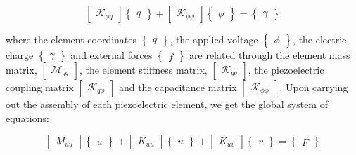 \documentclass{ifacconf}
\begin{document}
\begin{equation}
\begin{bmatrix} \mathcal{K}_{\phi q} \end{bmatrix} \begin{Bmatrix} q \end{Bmatrix} + \begin{bmatrix} \mathcal{K}_{\phi \phi} \end{bmatrix} \begin{Bmatrix} \phi \end{Bmatrix} = \begin{Bmatrix} \gamma \end{Bmatrix}
\end{equation}

where the element coordinates $\begin{Bmatrix} q \end{Bmatrix}$, the applied voltage $\begin{Bmatrix} \phi \end{Bmatrix}$, the electric charge $\begin{Bmatrix} \gamma \end{Bmatrix}$ and external forces $\begin{Bmatrix} f \end{Bmatrix}$  are related through the element mass matrix, $\begin{bmatrix} \mathcal{M}_{qq} \end{bmatrix}$, the element stiffness matrix, $\begin{bmatrix} \mathcal{K}_{qq} \end{bmatrix}$, the piezoelectric coupling matrix $\begin{bmatrix} \mathcal{K}_{q\phi} \end{bmatrix}$ and the capacitance matrix $\begin{bmatrix} \mathcal{K}_{\phi \phi} \end{bmatrix}$. Upon carrying out the assembly of each piezoelectric element, we get  the global system of equations:

\begin{equation}
\label{eq:generalPiezo1}
\begin{bmatrix} M_{uu} \end{bmatrix} \begin{Bmatrix} \ddot{u} \end{Bmatrix} + \begin{bmatrix} K_{uu} \end{bmatrix} \begin{Bmatrix} u\end{Bmatrix} + \begin{bmatrix} K_{uv} \end{bmatrix} \begin{Bmatrix} v \end{Bmatrix} = \begin{Bmatrix} F \end{Bmatrix}
\end{equation}
\end{document}
